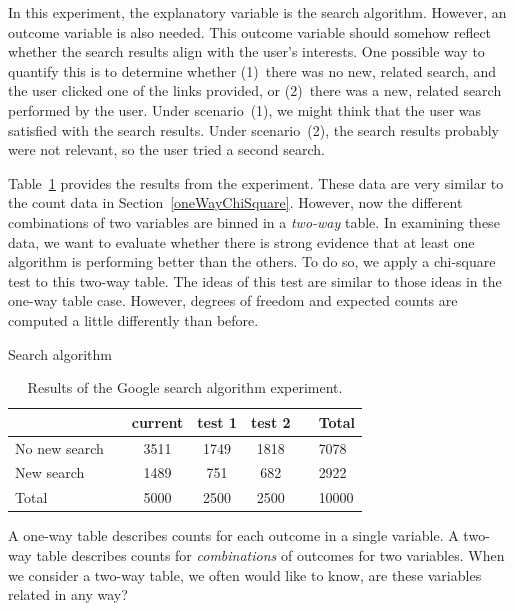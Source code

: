 In this experiment, the explanatory variable is the search algorithm. However, an outcome variable is also needed. This outcome variable should somehow reflect whether the search results align with the user's interests. One possible way to quantify this is to determine whether (1)~there was no new, related search, and the user clicked one of the links provided, or (2)~there was a new, related search performed by the user. Under scenario~(1), we might think that the user was satisfied with the search results. Under scenario~(2), the search results probably were not relevant, so the user tried a second search.

Table~\ref{googleSearchAlgorithmByAlgorithmAndPerformanceWithTotals} provides the results from the experiment. These data are very similar to the count data in Section~\ref{oneWayChiSquare}. However, now the different combinations of two variables are binned in a \emph{two-way} table. In examining these data, we want to evaluate whether there is strong evidence that at least one algorithm is performing better than the others. To do so, we apply a chi-square test to this two-way table. The ideas of this test are similar to those ideas in the one-way table case. However, degrees of freedom and expected counts are computed a little differently than before.

\begin{table}[h]
\centering
\quad \quad \quad \quad Search algorithm \\
\begin{tabular}{ll ccc ll}
\hline
 & \hspace{1mm} & current & test 1 & test 2 & \hspace{1mm} & Total \\
\hline
No new search				   & & 3511    & 1749 & 1818 & 				& 7078 \\
New search				   & & 1489    & 751	& 682    &				& 2922 \\
\hline
Total						   & & 5000    & 2500 & 2500 & 				& 10000 \\
\hline
\end{tabular}
\caption{Results of the Google search algorithm experiment.}
\label{googleSearchAlgorithmByAlgorithmAndPerformanceWithTotals}
\end{table}

\begin{tipBox}{
A one-way table describes counts for each outcome in a single variable. A two-way table describes counts for \emph{combinations} of outcomes for two variables. When we consider a two-way table, we often would like to know, are these variables related in any way?}
\end{tipBox}

